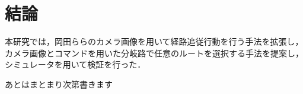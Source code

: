 \chapter{結論}

本研究では，岡田ら\cite{okada}らのカメラ画像を用いて経路追従行動を行う手法を拡張し，
カメラ画像とコマンドを用いた分岐路で任意のルートを選択する手法を提案し，シミュレータを用いて検証を行った．

あとはまとまり次第書きます